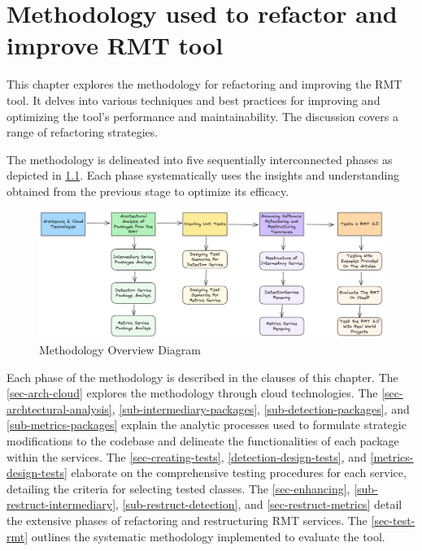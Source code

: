 \chapter{Methodology used to refactor and improve RMT tool}%
\label{methodology}

This chapter explores the methodology for refactoring and improving the RMT tool. It delves into various techniques and best practices for improving and optimizing the tool's performance and maintainability. The discussion covers a range of refactoring strategies.

The methodology is delineated into five sequentially interconnected phases as depicted in \cref{fig-overview-methodology}. Each phase systematically uses the insights and understanding obtained from the previous stage to optimize its efficacy. 

\begin{figure}[ht!]
\SetCaptionWidth{\textwidth}
\caption{Methodology Overview Diagram}
\label{fig-overview-methodology}
\includegraphics[width =\textwidth]{Chapter-4/Figures/Metodologia.png}
\end{figure}
\FloatBarrier


Each phase of the methodology is described in the clauses of this chapter. The \cref{sec-arch-cloud} explores the methodology through cloud technologies. The \cref{sec-archtectural-analysis}, \ref{sub-intermediary-packages}, \ref{sub-detection-packages}, and \ref{sub-metrics-packages} explain the analytic processes used to formulate strategic modifications to the codebase and delineate the functionalities of each package within the services. The \cref{sec-creating-tests}, \ref{detection-design-tests}, and \ref{metrics-design-tests} elaborate on the comprehensive testing procedures for each service, detailing the criteria for selecting tested classes. The \cref{sec-enhancing}, \ref{sub-restruct-intermediary}, \ref{sub-restruct-detection}, and \ref{sec-restruct-metrics} detail the extensive phases of refactoring and restructuring RMT services. The \cref{sec-test-rmt} outlines the systematic methodology implemented to evaluate the tool.

